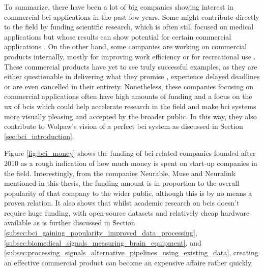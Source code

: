 To summarize, there have been a lot of big companies showing interest in commercial \gls{bci} applications in the past few years.
Some might contribute directly to the field by funding scientific research, which is often still focused on medical applications but whose results can show potential for certain commercial applications \citep{facebook_bci_blog, facebook_bci_keyboard, neuralink_whitepaper}.
On the other hand, some companies are working on commercial products internally, mostly for improving work efficiency \citep{fb_building8, bci_nude_detection} or for recreational use \citep[Muse and InteraXon headband,][]{valve_bci_interest}.
These commercial products have yet to see truly successful examples, as they are either questionable in delivering what they promise \citep{interaxon_tests}, experience delayed deadlines or are even cancelled in their entirety.
Nonetheless, these companies focusing on commercial applications often have high amounts of funding and a focus on the \gls{ux} of \glspl{bci} which could help accelerate research in the field and make \gls{bci} systems more visually pleasing and accepted by the broader public.
In this way, they also contribute to Wolpaw's vision of a perfect \gls{bci} system as discussed in Section \ref{sec:bci_introduction}.

Figure \ref{fig:bci_money} shows the funding of \gls{bci}-related companies founded after 2010 as a rough indication of how much money is spent on start-up companies in the field.
Interestingly, from the companies Neurable, Muse and Neuralink mentioned in this thesis, the funding amount is in proportion to the overall popularity of that company to the wider public, although this is by no means a proven relation.
It also shows that whilst academic research on \glspl{bci} doesn't require huge funding, with open-source datasets and relatively cheap hardware available as is further discussed in Section \ref{subsec:bci_gaining_popularity_improved_data_processing}, \ref{subsec:biomedical_signals_measuring_brain_equipment}, and \ref{subsec:processing_signals_alternative_pipelines_using_existing_data}, creating an effective commercial product can become an expensive affaire rather quickly.

